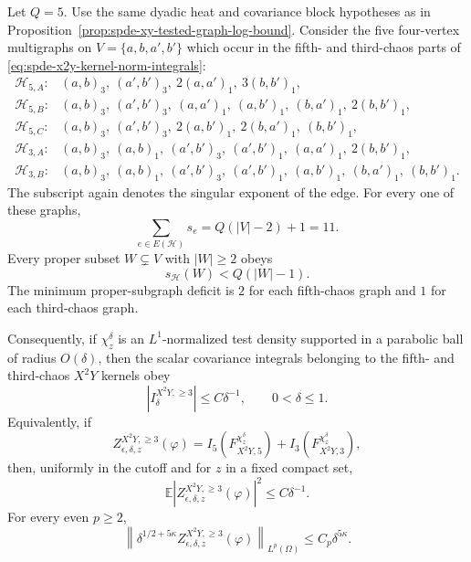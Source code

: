 \begin{proposition}
\label{prop:spde-x2y-high-chaos-tested-coordinate-bound}
Let \(Q=5\).  Use the same dyadic heat and covariance block hypotheses as in
Proposition~\ref{prop:spde-xy-tested-graph-log-bound}.  Consider the five
four-vertex multigraphs on \(V=\{a,b,a',b'\}\) which occur in the fifth- and
third-chaos parts of
\eqref{eq:spde-x2y-kernel-norm-integrals}:
\[
\begin{array}{ll}
  \mathcal H_{5,A}:&
  (a,b)_3,\ (a',b')_3,\ 2(a,a')_1,\ 3(b,b')_1,\\[0.25em]
  \mathcal H_{5,B}:&
  (a,b)_3,\ (a',b')_3,\ (a,a')_1,\ (a,b')_1,\
  (b,a')_1,\ 2(b,b')_1,\\[0.25em]
  \mathcal H_{5,C}:&
  (a,b)_3,\ (a',b')_3,\ 2(a,b')_1,\ 2(b,a')_1,\ (b,b')_1,\\[0.25em]
  \mathcal H_{3,A}:&
  (a,b)_3,\ (a,b)_1,\ (a',b')_3,\ (a',b')_1,\
  (a,a')_1,\ 2(b,b')_1,\\[0.25em]
  \mathcal H_{3,B}:&
  (a,b)_3,\ (a,b)_1,\ (a',b')_3,\ (a',b')_1,\
  (a,b')_1,\ (b,a')_1,\ (b,b')_1 .
\end{array}
\]
The subscript again denotes the singular exponent of the edge.  For every
one of these graphs,
\begin{equation}
  \sum_{e\in E(\mathcal H)}s_e
  =
  Q(|V|-2)+1=11 .
  \label{eq:spde-x2y-high-chaos-graph-total-degree}
\end{equation}
Every proper subset \(W\subsetneq V\) with \(|W|\geq2\) obeys
\[
  s_{\mathcal H}(W)<Q(|W|-1).
\]
The minimum proper-subgraph deficit is \(2\) for each fifth-chaos graph and
\(1\) for each third-chaos graph.

Consequently, if \(\chi_z^\delta\) is an \(L^1\)-normalized test density
supported in a parabolic ball of radius \(O(\delta)\), then the scalar
covariance integrals belonging to the fifth- and third-chaos \(X^2Y\) kernels
obey
\begin{equation}
  |I_\delta^{X^2Y,\geq3}|
  \leq C\delta^{-1},
  \qquad 0<\delta\leq1 .
  \label{eq:spde-x2y-high-chaos-graph-power-bound}
\end{equation}
Equivalently, if
\[
  Z_{\epsilon,\delta,z}^{X^2Y,\geq3}(\varphi)
  =
  I_5(F_{X^2Y,5}^{\chi_z^\delta})
  +
  I_3(F_{X^2Y,3}^{\chi_z^\delta}),
\]
then, uniformly in the cutoff and for \(z\) in a fixed compact set,
\begin{equation}
  \mathbb E
  \left|
    Z_{\epsilon,\delta,z}^{X^2Y,\geq3}(\varphi)
  \right|^2
  \leq C\delta^{-1}.
  \label{eq:spde-x2y-high-chaos-tested-l2}
\end{equation}
For every even \(p\geq2\),
\begin{equation}
  \left\|
    \delta^{1/2+5\kappa}
    Z_{\epsilon,\delta,z}^{X^2Y,\geq3}(\varphi)
  \right\|_{L^p(\Omega)}
  \leq
  C_p\delta^{5\kappa}.
  \label{eq:spde-x2y-high-chaos-normalized-slack}
\end{equation}
\end{proposition}

